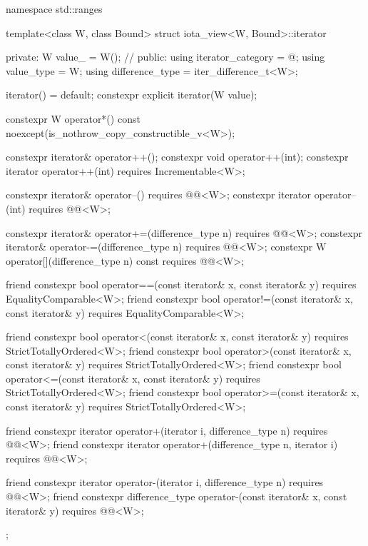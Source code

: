 \begin{codeblock}
namespace std::ranges {
  template<class W, class Bound>
  struct iota_view<W, Bound>::iterator {
  private:
    W value_ = W();             // \expos
  public:
    using iterator_category = @\seebelow@;
    using value_type = W;
    using difference_type = iter_difference_t<W>;

    iterator() = default;
    constexpr explicit iterator(W value);

    constexpr W operator*() const noexcept(is_nothrow_copy_constructible_v<W>);

    constexpr iterator& operator++();
    constexpr void operator++(int);
    constexpr iterator operator++(int) requires Incrementable<W>;

    constexpr iterator& operator--() requires @@<W>;
    constexpr iterator operator--(int) requires @@<W>;

    constexpr iterator& operator+=(difference_type n)
      requires @@<W>;
    constexpr iterator& operator-=(difference_type n)
      requires @@<W>;
    constexpr W operator[](difference_type n) const
      requires @@<W>;

    friend constexpr bool operator==(const iterator& x, const iterator& y)
      requires EqualityComparable<W>;
    friend constexpr bool operator!=(const iterator& x, const iterator& y)
      requires EqualityComparable<W>;

    friend constexpr bool operator<(const iterator& x, const iterator& y)
      requires StrictTotallyOrdered<W>;
    friend constexpr bool operator>(const iterator& x, const iterator& y)
      requires StrictTotallyOrdered<W>;
    friend constexpr bool operator<=(const iterator& x, const iterator& y)
      requires StrictTotallyOrdered<W>;
    friend constexpr bool operator>=(const iterator& x, const iterator& y)
      requires StrictTotallyOrdered<W>;

    friend constexpr iterator operator+(iterator i, difference_type n)
      requires @@<W>;
    friend constexpr iterator operator+(difference_type n, iterator i)
      requires @@<W>;

    friend constexpr iterator operator-(iterator i, difference_type n)
      requires @@<W>;
    friend constexpr difference_type operator-(const iterator& x, const iterator& y)
      requires @@<W>;
  };
}
\end{codeblock}

